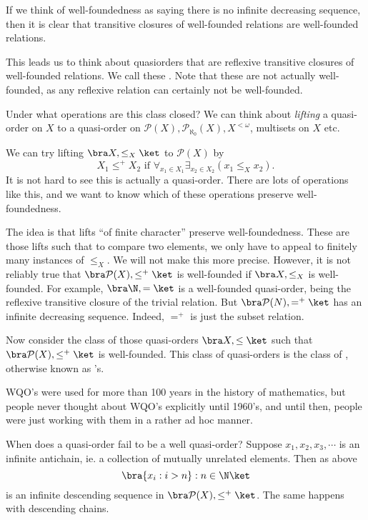 \documentclass[a4paper]{article}
\begin{document}
If we think of well-foundedness as saying there is no infinite decreasing sequence, then it is clear that transitive closures of well-founded relations are well-founded relations.

This leads us to think about quasiorders that are reflexive transitive closures of well-founded relations. We call these . Note that these are not actually well-founded, as any reflexive relation can certainly not be well-founded.

Under what operations are this class closed? We can think about \emph{lifting} a quasi-order on $X$ to a quasi-order on $\mathcal{P}(X), \mathcal{P}_{\aleph_0}(X), X^{ < \omega}$, multisets on $X$ etc. %

We can try lifting $\bra X, \leq_X\ket$ to $\mathcal{P}(X)$ by
\[
  X_1\leq^+ X_2\text{ if }\forall_{x_1 \in X_1} \exists_{x_2 \in X_2} (x_1 \leq_X x_2).
\]
It is not hard to see this is actually a quasi-order. There are lots of operations like this, and we want to know which of these operations preserve well-foundedness.

The idea is that lifts ``of finite character'' preserve well-foundedness. These are those lifts such that to compare two elements, we only have to appeal to finitely many instances of $\leq_X$. We will not make this more precise. However, it is not reliably true that $\bra \mathcal{P}(X), \leq^+\ket$ is well-founded if $\bra X, \leq_X$ is well-founded. For example, $\bra \N, =\ket$ is a well-founded quasi-order, being the reflexive transitive closure of the trivial relation. But $\bra \mathcal{P}(N), =^+\ket$ has an infinite decreasing sequence. Indeed, $=^+$ is just the subset relation.


Now consider the class of those quasi-orders $\bra X, \leq\ket$ such that $\bra \mathcal{P}(X), \leq^+\ket$ is well-founded. This class of quasi-orders is the class of , otherwise known as 's.

WQO's were used for more than 100 years in the history of mathematics, but people never thought about WQO's explicitly until 1960's, and until then, people were just working with them in a rather ad hoc manner.

When does a quasi-order fail to be a well quasi-order? Suppose $x_1, x_2, x_3, \cdots$ is an infinite antichain, ie. a collection of mutually unrelated elements. Then as above
\[
  \bra \{x_i: i > n\}: n \in \N\ket
\]
is an infinite descending sequence in $\bra \mathcal{P}(X), \leq^+\ket$. The same happens with descending chains.
\end{document}
